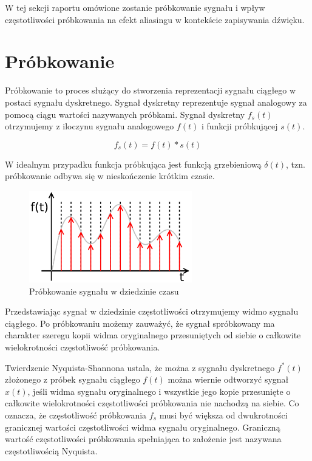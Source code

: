 \documentclass[a4paper,12pt]{extarticle}
\begin{document}
W tej sekcji raportu omówione zostanie próbkowanie sygnału i wpływ częstotliwości próbkowania na efekt aliasingu w kontekście zapisywania dźwięku.
       
\section*{Próbkowanie}

Próbkowanie to proces służący do stworzenia reprezentacji sygnału ciągłego w postaci sygnału dyskretnego. Sygnał dyskretny reprezentuje sygnał analogowy za pomocą ciągu wartości nazywanych próbkami. Sygnał dyskretny \(f_s(t)\) otrzymujemy z iloczynu sygnału analogowego \(f(t)\) i funkcji próbkującej \(s(t)\).

\[f_s(t) = f(t) * s(t)\]

W idealnym przypadku funkcja próbkująca jest funkcją grzebieniową \(\delta(t)\), tzn. próbkowanie odbywa się w nieskończenie krótkim czasie.

\begin{figure}[h]
\includegraphics[height=4cm]{SampledSignal.png}
\centering
\caption{Próbkowanie sygnału w dziedzinie czasu}
\end{figure}

Przedstawiając sygnał w dziedzinie częstotliwości otrzymujemy widmo sygnału ciągłego. Po próbkowaniu możemy zauważyć, że sygnał spróbkowany ma charakter szeregu kopii widma oryginalnego przesuniętych od siebie o całkowite wielokrotności częstotliwość próbkowania.

Twierdzenie Nyquista-Shannona ustala, że można z sygnału dyskretnego \(f^*(t)\) złożonego z próbek sygnału ciągłego \(f(t)\) można wiernie odtworzyć sygnał \(x(t)\), jeśli widma sygnału oryginalnego i wszystkie jego kopie przesunięte o całkowite wielokrotności częstotliwości próbkowania nie nachodzą na siebie. Co oznacza, że częstotliwość próbkowania \(f_s\) musi być większa od dwukrotności granicznej wartości częstotliwości widma sygnału oryginalnego. Graniczną wartość częstotliwości próbkowania spełniająca to założenie jest nazywana częstotliwością Nyquista.
\end{document}
